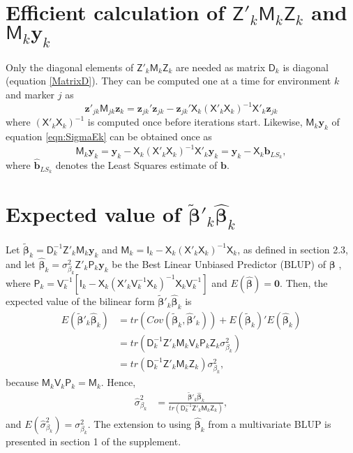 \documentclass{bmcart}
\newcommand{\vecx}{\boldsymbol}
\newcommand{\mat}[1]{\boldsymbol{\mathsf{#1}}}
\begin{document}
\appendix

\section{Efficient calculation of $\mat{Z}'_{k} \mat{M}_{k} \mat{Z}_{k}$ and  $\mat{M}_{k}\vecx{y}_k$\label{byPassM}}

Only the diagonal elements of  $\mat{Z}'_{k} \mat{M}_{k} \mat{Z}_{k}$ are needed as matrix $\mat{D}_k$ is diagonal (equation \ref{MatrixD}). They can be computed one at a time for environment $k$ and marker $j$ as
\begin{equation}\nonumber
\label{eqn:TrZMZ}
\vecx{z}'_{jk} \mat{M}_{jk} \vecx{z}_{k}  = \vecx{z}_{jk}'\vecx{z}_{jk} - \vecx{z}_{jk}'\mat{X}_{k}(\mat{X}'_{k} \mat{X}_{k})^{-1} \mat{X}'_{k} \vecx{z}_{jk}
\end{equation}
where $(\mat{X}'_{k} \mat{X}_{k})^{-1}$ is computed once before iterations start. Likewise, $\mat{M}_{k}\vecx{y}_k$ of equation \ref{eqn:SigmaEk} can be obtained once as 
\begin{equation}\nonumber
\label{eqn:My}
\mat{M}_{k}\vecx{y}_k = \vecx{y}_k - \mat{X}_{k}(\mat{X}'_{k} \mat{X}_{k})^{-1} \mat{X}'_{k} \vecx{y}_k = \vecx{y}_k - \mat{X}_{k} \vecx{\hat{b}}_{LS_k},
\end{equation}
where $\vecx{\hat{b}}_{LS_k}$ denotes the Least Squares estimate of $\vecx{b}$.


\section{Expected value of $\tilde{\vecx{\beta}}'_k\hat{\vecx{\beta}}_k$\label{EVTH}}

Let $\tilde{\vecx{\beta}}_k = \mat{D}^{-1}_k\mat{Z}'_k\mat{M}_k\vecx{y}_k$ and $\mat{M}_k = \mat{I}_k - \mat{X}_k(\mat{X}'_k\mat{X}_k)^{-1}\mat{X}_k$, as defined in section 2.3, and let $\hat{\vecx{\beta}}_k = \sigma^2_{\beta_k}\mat{Z}'_k\mat{P}_k\vecx{y}_k$ be the Best Linear Unbiased Predictor (BLUP) of $\vecx{\beta}$ \cite{Searle1992BLUP}, where $\mat{P}_k = \mat{V}^{-1}_k[\mat{I}_k-\mat{X}_k(\mat{X}'_k\mat{V}^{-1}_k\mat{X}_k)^{-1}\mat{X}_k\mat{V}^{-1}_k]$ and $E(\hat{\vecx{\beta}}) = \vecx{0}$. Then, the expected value of the bilinear form  $\tilde{\vecx{\beta}}'_k\hat{\vecx{\beta}}_k$ \cite{Searl71} is
\begin{align*}
    E(\tilde{\vecx{\beta}}'_k\hat{\vecx{\beta}}_k) &= tr(Cov(\tilde{\vecx{\beta}}_k, \hat{\vecx{\beta}}'_k)) + E(\tilde{\vecx{\beta}}_k)'E(\hat{\vecx{\beta}}_k)\\
    &= tr(\mat{D}^{-1}_k\mat{Z}'_k\mat{M}_k\mat{V}_k\mat{P}_k\mat{Z}_k\sigma^2_{\beta_k})\\
    &= tr(\mat{D}^{-1}_k\mat{Z}'_k\mat{M}_k\mat{Z}_k)\sigma^2_{\beta_k},
\end{align*}
because $\mat{M}_k\mat{V}_k\mat{P}_k = \mat{M}_k$. Hence, 
\begin{align*}
    \hat{\sigma}^2_{\beta_k} &= \frac{\tilde{\vecx{\beta}}'_k\hat{\vecx{\beta}}_k}{tr(\mat{D}^{-1}_k\mat{Z}'_k\mat{M}_k\mat{Z}_k)},
\end{align*}
and $E(\hat{\sigma}^2_{\beta_k}) = \sigma^2_{\beta_k}$. The extension to using $\hat{\vecx{\beta}}_k$ from a multivariate BLUP is presented in section 1 of the supplement.
\end{document}
